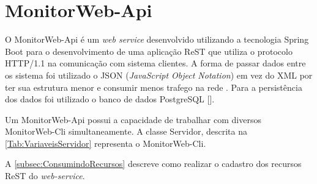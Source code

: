 

\section{MonitorWeb-Api}\label{sec:MonitorWeb-Api}

O MonitorWeb-Api é um \textit{web service} desenvolvido utilizando a tecnologia Spring Boot para o desenvolvimento de uma aplicação ReST que utiliza o protocolo HTTP/1.1 na comunicação com sistema clientes. A forma de passar dados entre os sistema foi utilizado o JSON (\textit{JavaScript Object Notation}) em vez do XML por ter sua estrutura menor e consumir menos trafego na rede \cite{Saudate:2014}. Para a persistência dos dados foi utilizado o banco de dados PostgreSQL [\cite{Postgres}].

Um MonitorWeb-Api possui a capacidade de trabalhar com diversos MonitorWeb-Cli simultaneamente. A classe Servidor, descrita na \autoref{Tab:VariaveisServidor} representa o MonitorWeb-Cli.

A \autoref{subsec:ConsumindoRecursos} descreve como realizar o cadastro dos recursos ReST do \textit{web-service}. 


